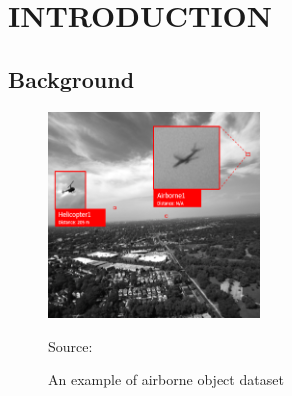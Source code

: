\chapter{INTRODUCTION}
\section{Background}
\label{section:background}
    \begin{figure} [H]
        \centering
        \includegraphics[width=0.5\textwidth]{figures/dataset-example-labeled.png}
        \caption*{Source: \textcite{aot_dataset}}
        \caption{An example of airborne object dataset}
        \label{fig:airborne-object-example-1}
    \end{figure}
    \vspace{-2ex}


